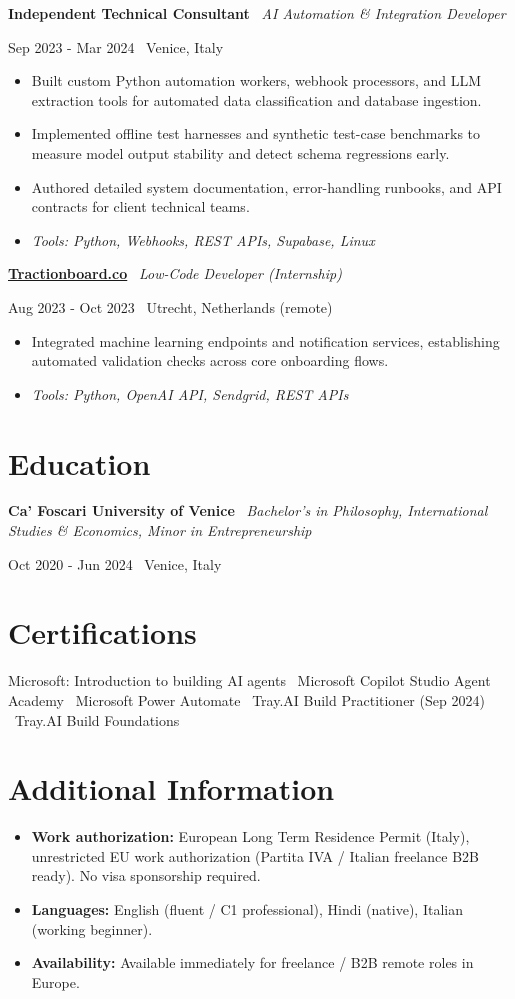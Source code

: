\documentclass[a4paper,10pt]{article}
\newcommand{\role}[4]{%
 \vspace{2pt}\noindent
 \begin{minipage}[t]{0.70\textwidth}\raggedright\textbf{#1} \textbullet\ \textit{#3}\end{minipage}%
 \hfill
 \begin{minipage}[t]{0.28\textwidth}\raggedleft\footnotesize\color{gray}#2 \textbullet\ #4\end{minipage}%
 \vspace{1pt}%
}
\begin{document}
\role{Independent Technical Consultant}{Sep 2023 - Mar 2024}{AI Automation \& Integration Developer}{Venice, Italy}
\begin{itemize}
 \item Built custom Python automation workers, webhook processors, and LLM extraction tools for automated data classification and database ingestion.
 \item Implemented offline test harnesses and synthetic test-case benchmarks to measure model output stability and detect schema regressions early.
 \item Authored detailed system documentation, error-handling runbooks, and API contracts for client technical teams.
 \item \textit{Tools: Python, Webhooks, REST APIs, Supabase, Linux}
\end{itemize}

\role{\href{https://tractionboard.co}{Tractionboard.co}}{Aug 2023 - Oct 2023}{Low-Code Developer (Internship)}{Utrecht, Netherlands (remote)}
\begin{itemize}
 \item Integrated machine learning endpoints and notification services, establishing automated validation checks across core onboarding flows.
 \item \textit{Tools: Python, OpenAI API, Sendgrid, REST APIs}
\end{itemize}

\section{Education}
\role{Ca' Foscari University of Venice}{Oct 2020 - Jun 2024}{Bachelor's in Philosophy, International Studies \& Economics, Minor in Entrepreneurship}{Venice, Italy}

\section{Certifications}
Microsoft: Introduction to building AI agents \textbullet\ Microsoft Copilot Studio Agent Academy \textbullet\ Microsoft Power Automate \textbullet\ Tray.AI Build Practitioner (Sep 2024) \textbullet\ Tray.AI Build Foundations

\section{Additional Information}
\begin{itemize}
 \item \textbf{Work authorization:} European Long Term Residence Permit (Italy), unrestricted EU work authorization (Partita IVA / Italian freelance B2B ready). No visa sponsorship required.
 \item \textbf{Languages:} English (fluent / C1 professional), Hindi (native), Italian (working beginner).
 \item \textbf{Availability:} Available immediately for freelance / B2B remote roles in Europe.
\end{itemize}
\end{document}
